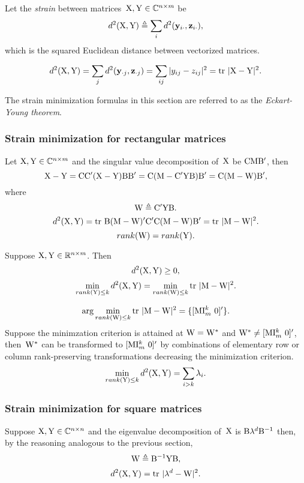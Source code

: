 \documentclass[10pt,a4paper]{article}
\theoremstyle{plain} \newtheorem{Lem}{Lemma}
\begin{document}
Let the {\em strain} between matrices~$\mathrm X, \mathrm Y \in \mathbb C^{n \times m}$ be
$$ d^2(\mathrm X,\mathrm Y) \triangleq \sum_i d^2(\mathbf y_{i \cdot}, \mathbf z_{i \cdot}), $$
which is the squared Euclidean distance between vectorized matrices.

$$ d^2(\mathrm X,\mathrm Y) = \sum_j d^2(\mathbf y_{\cdot j}, \mathbf z_{\cdot j}) = \sum_{ij} |y_{ij} - z_{ij}|^2 = \mathrm {tr} \  |\mathrm X - \mathrm Y|^2. $$

The strain minimization formulas in this section are referred to as the {\em Eckart-Young theorem}.


\subsubsection{Strain minimization for rectangular matrices}

Let $\mathrm X, \mathrm Y \in \mathbb C^{n \times m}$ and the singular value decomposition of~$\mathrm X$ be $\mathrm C \mathrm M \mathrm B'$,
then
$$ \mathrm X - \mathrm Y = \mathrm C \mathrm C' (\mathrm X - \mathrm Y) \mathrm B \mathrm B' = \mathrm C (\mathrm M - \mathrm C' \mathrm Y \mathrm B) \mathrm B' = \mathrm C (\mathrm M - \mathrm W) \mathrm B', $$
where
$$ \mathrm W \triangleq \mathrm C' \mathrm Y \mathrm B. $$
$$ d^2(\mathrm X,\mathrm Y) = \mathrm {tr} \  \mathrm B (\mathrm M - \mathrm W)' \mathrm C' \mathrm C (\mathrm M - \mathrm W) \mathrm B' = \mathrm {tr} \  |\mathrm M -\mathrm W|^2 . $$
$$ rank(\mathrm W) = rank(\mathrm Y). $$

Suppose $\mathrm X, \mathrm Y \in \mathbb R^{n \times m}$.
Then
$$ d^2(\mathrm X,\mathrm Y) \ge 0, $$
$$ \min_{rank(\mathrm Y) \le k} d^2 (\mathrm X, \mathrm Y) = \min_{rank(\mathrm W) \le k} \mathrm {tr} \  |\mathrm M -\mathrm W|^2. $$

$$ \arg \min_{rank(\mathrm W) \le k} \mathrm {tr} \  |\mathrm M -\mathrm W|^2 = \{[\mathrm M \mathrm I_m^k \ \mathrm 0]' \} . $$
\proof
{ Suppose the minimzation criterion is attained at $\mathrm W = \mathrm W^*$ and $\mathrm W^* \ne [\mathrm M \mathrm I_m^k \ \mathrm 0]'$,
then~$\mathrm W^*$ can be transformed to $[\mathrm M \mathrm I_m^k \ \mathrm 0]'$
by combinations of elementary row or column rank-preserving transformations
decreasing the minimization criterion.
}
$$ \min_{rank(\mathrm Y) \le k} d^2 (\mathrm X, \mathrm Y) = \sum_{i > k} \lambda_i. $$


\subsubsection{Strain minimization for square matrices}
Suppose $\mathrm X, \mathrm Y \in \mathbb C^{n \times n}$ and the eigenvalue decomposition of~$\mathrm X$ is $\mathrm B \mathbf \lambda^d \mathrm B^{-1}$
then,
by the reasoning analogous to the previous section,
$$ \mathrm W \triangleq \mathrm B^{-1} \mathrm Y \mathrm B, $$
$$ d^2(\mathrm X,\mathrm Y) = \mathrm {tr} \  |\mathbf \lambda^d -\mathrm W|^2. $$
\end{document}
